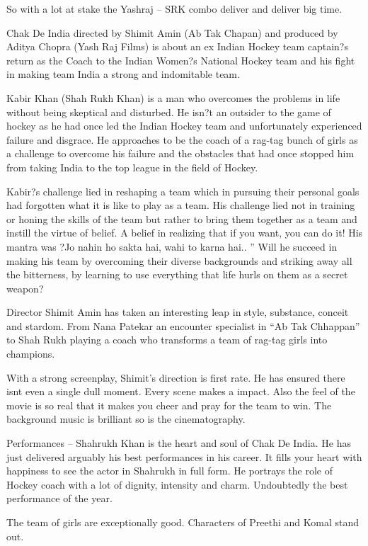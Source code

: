 \documentclass[11pt]{article}
\begin{document}
So with a lot at stake the Yashraj – SRK combo deliver and deliver big time.

Chak De India directed by Shimit Amin (Ab Tak Chapan) and produced by Aditya Chopra (Yash Raj Films) is about an ex Indian Hockey team captain?s return as the Coach to the Indian Women?s National Hockey team and his fight in making team India a strong and indomitable team.

Kabir Khan (Shah Rukh Khan) is a man who overcomes the problems in life without being skeptical and disturbed. He isn?t an outsider to the game of hockey as he had once led the Indian Hockey team and unfortunately experienced failure and disgrace. He approaches to be the coach of a rag-tag bunch of girls as a challenge to overcome his failure and the obstacles that had once stopped him from taking India to the top league in the field of Hockey.

Kabir?s challenge lied in reshaping a team which in pursuing their personal goals had forgotten what it is like to play as a team. His challenge lied not in training or honing the skills of the team but rather to bring them together as a team and instill the virtue of belief. A belief in realizing that if you want, you can do it! His mantra was ?Jo nahin ho sakta hai, wahi to karna hai.. ” Will he succeed in making his team by overcoming their diverse backgrounds and striking away all the bitterness, by learning to use everything that life hurls on them as a secret weapon?

Director Shimit Amin has taken an interesting leap in style, substance, conceit and stardom. From Nana Patekar an encounter specialist in “Ab Tak Chhappan” to Shah Rukh playing a coach who transforms a team of rag-tag girls into champions.

With a strong screenplay, Shimit’s direction is first rate. He has ensured there isnt even a single dull moment. Every scene makes a impact. Also the feel of the movie is so real that it makes you cheer and pray for the team to win. The background music is brilliant so is the cinematography.

Performances – Shahrukh Khan is the heart and soul of Chak De India. He has just delivered arguably his best performances in his career. It fills your heart with happiness to see the actor in Shahrukh in full form. He portrays the role of Hockey coach with a lot of dignity, intensity and charm. Undoubtedly the best performance of the year.

The team of girls are exceptionally good. Characters of Preethi and Komal stand out.
\end{document}
